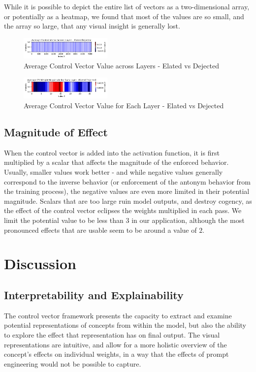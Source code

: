 \documentclass[11pt,a4paper]{article}
\begin{document}
While it is possible to depict the entire list of vectors as a two-dimensional array, or potentially as a heatmap, we found that most of the values are so small, and the array so large, that any visual insight is generally lost.

\begin{figure}[!ht]
\centering
\includegraphics[width = 0.4\textwidth]{assets/Elated_Dejected_mean_values.png}
\caption{Average Control Vector Value across Layers - Elated vs Dejected}
\label{fig:elated_effect}
\end{figure}

\begin{figure}[!ht]
\centering
\includegraphics[width = 0.4\textwidth]{assets/Elated_Dejected_mean_values_trans.png}
\caption{Average Control Vector Value for Each Layer - Elated vs Dejected}
\label{fig:elated_mag}
\end{figure}


\subsection{Magnitude of Effect}
When the control vector is added into the activation function, it is first multiplied by a scalar that affects the magnitude of the enforced behavior. Usually, smaller values work better - and while negative values generally correspond to the inverse behavior (or enforcement of the antonym behavior from the training process), the negative values are even more limited in their potential magnitude. Scalars that are too large ruin model outputs, and destroy cogency, as the effect of the control vector eclipses the weights multiplied in each pass. We limit the potential value to be less than $3$ in our application, although the most pronounced effects that are usable seem to be around a value of $2$.

\section{Discussion}
\subsection{Interpretability and Explainability}
The control vector framework presents the capacity to extract and examine potential representations of concepts from within the model, but also the ability to explore the effect that representation has on final output. The visual representations are intuitive, and allow for a more holistic overview of the concept's effects on individual weights, in a way that the effects of prompt engineering would not be possible to capture. 
\end{document}
